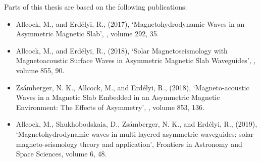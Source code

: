 \begin{publications}

Parts of this thesis are based on the following publications:
\begin{itemize}
\item Allcock, M., and Erd{\'e}lyi, R., (2017), `Magnetohydrodynamic Waves in an Asymmetric Magnetic Slab', \solphys, volume 292, 35.
\item Allcock, M., and Erd{\'e}lyi, R., (2018), `Solar Magnetoseismology with Magnetoacoustic Surface Waves in Asymmetric Magnetic Slab Waveguides', \apj, volume 855, 90.
\item Zs\'{a}mberger, N. K., Allcock, M., and
Erd{\'e}lyi, R., (2018), `Magneto-acoustic Waves in a Magnetic Slab Embedded in an Asymmetric
Magnetic Environment: The Effects of Asymmetry', \apj, volume 853, 136.
\item Allcock, M., Shukhobodskaia, D., Zs{\'a}mberger, N. K., and Erd{\'e}lyi, R., (2019), `Magnetohydrodynamic waves in multi-layered asymmetric waveguides: solar magneto-seismology theory and application', Frontiers in Astronomy and Space Sciences, volume 6, 48.
\end{itemize}



\end{publications}